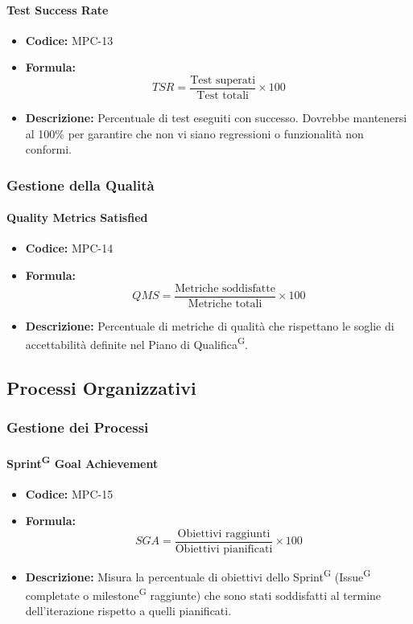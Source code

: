 \documentclass[a4paper, 11pt]{article}
\begin{document}
\paragraph{Test Success Rate}
\begin{itemize}
    \item \textbf{Codice:} MPC-13 
    \item \textbf{Formula:} $$TSR = \frac{\text{Test superati}}{\text{Test totali}} \times 100$$
    \item \textbf{Descrizione:} Percentuale di test eseguiti con successo. Dovrebbe mantenersi al 100\% per garantire che non vi siano regressioni o funzionalità non conformi.
\end{itemize}

\subsubsection{Gestione della Qualità}

\paragraph{Quality Metrics Satisfied}
\begin{itemize}
    \item \textbf{Codice:} MPC-14 
    \item \textbf{Formula:} $$QMS = \frac{\text{Metriche soddisfatte}}{\text{Metriche totali}} \times 100$$
    \item \textbf{Descrizione:} Percentuale di metriche di qualità che rispettano le soglie di accettabilità definite nel Piano di Qualifica\textsuperscript{G}.
\end{itemize}

\subsection{Processi Organizzativi}

\subsubsection{Gestione dei Processi}

\paragraph{Sprint\textsuperscript{G} Goal Achievement}
\begin{itemize}
    \item \textbf{Codice:} MPC-15 
    \item \textbf{Formula:} $$SGA = \frac{\text{Obiettivi raggiunti}}{\text{Obiettivi pianificati}} \times 100$$
    \item \textbf{Descrizione:} Misura la percentuale di obiettivi dello Sprint\textsuperscript{G} (Issue\textsuperscript{G} completate o milestone\textsuperscript{G} raggiunte) che sono stati soddisfatti al termine dell'iterazione rispetto a quelli pianificati.
\end{itemize}
\end{document}
